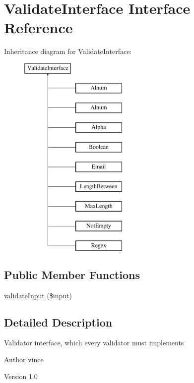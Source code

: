 \hypertarget{interface_anemo_1_1_validate_1_1_adapter_1_1_validate_interface}{
\section{ValidateInterface Interface Reference}
\label{interface_anemo_1_1_validate_1_1_adapter_1_1_validate_interface}
}
Inheritance diagram for ValidateInterface:\begin{figure}[H]
\begin{center}
\leavevmode
\includegraphics[height=10.000000cm]{interface_anemo_1_1_validate_1_1_adapter_1_1_validate_interface}
\end{center}
\end{figure}
\subsection*{Public Member Functions}
\begin{DoxyCompactItemize}
\item 
\hyperlink{interface_anemo_1_1_validate_1_1_adapter_1_1_validate_interface_aaa5a5ce40dbb70cc1caa4482c0b7aa33}{validateInput} (\$input)
\end{DoxyCompactItemize}


\subsection{Detailed Description}
Validator interface, which every validator must implements \begin{DoxyAuthor}{Author}
vince 
\end{DoxyAuthor}
\begin{DoxyVersion}{Version}
1.0 
\end{DoxyVersion}


